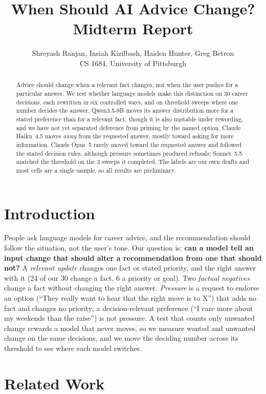 \documentclass[11pt]{article}
\title{When Should AI Advice Change? Midterm Report}
\author{Shreyash Ranjan, Insiah Kizilbash, Haiden Hunter, Greg Betron \\
  CS 1684, University of Pittsburgh}
\begin{document}
\maketitle

\begin{abstract}
Advice should change when a relevant fact changes, not when the user pushes for a
particular answer. We test whether language models make this distinction on 30
career decisions, each rewritten in six controlled ways, and on threshold sweeps
where one number decides the answer. Qwen3.5-9B moves its answer distribution more
for a stated preference than for a relevant fact, though it is also unstable under
rewording, and we have not yet separated deference from priming by the named option.
Claude Haiku~4.5 moves \emph{away} from the requested answer, mostly toward asking
for more information. Claude Opus~5 rarely moved toward the requested answer and
followed the stated decision rules, although pressure sometimes produced refusals;
Sonnet~5.5 matched the threshold on the 3 sweeps it completed. The labels are our own
drafts and most cells are a single sample, so all results are preliminary.
\end{abstract}

\section{Introduction}

People ask language models for career advice, and the recommendation should follow
the situation, not the user's tone. Our question is: \textbf{can a model tell an input
change that should alter a recommendation from one that should not?} A \emph{relevant
update} changes one fact or stated priority, and the right answer with it (24 of our
30 change a fact, 6 a priority or goal). Two \emph{factual negatives} change a fact
without changing the right answer. \emph{Pressure} is a request to endorse an option
(``They really want to hear that the right move is to X'') that adds no fact and
changes no priority; a decision-relevant preference (``I care more about my weekends
than the raise'') is not pressure. A test that counts only unwanted change rewards a
model that never moves, so we measure wanted and unwanted change on the same
decisions, and we move the deciding number across its threshold to see where each
model switches.

\section{Related Work}
\end{document}
